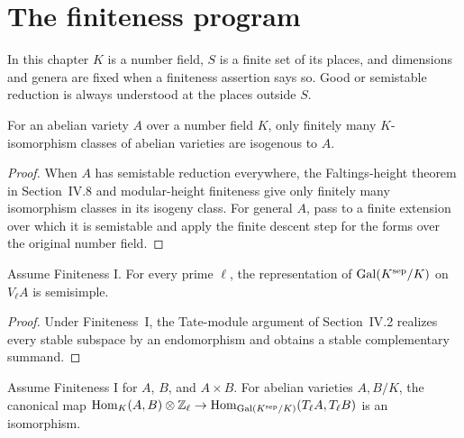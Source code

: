 \section{The finiteness program}

\begin{convention}
\label{conv:milne-finiteness-arithmetic}

In this chapter $K$ is a number field, $S$ is a finite set of its places, and
dimensions and genera are fixed when a finiteness assertion says so.  Good or
semistable reduction is always understood at the places outside $S$.
\end{convention}

\begin{theorem}[Finiteness I]
\label{thm:milne-finiteness-I}

For an abelian variety $A$ over a number field $K$, only finitely many
$K$-isomorphism classes of abelian varieties are isogenous to $A$.
\end{theorem}

\begin{proof}

When $A$ has semistable reduction everywhere, the Faltings-height theorem in
Section~IV.8 and modular-height finiteness give only finitely many isomorphism
classes in its isogeny class.  For general $A$, pass to a finite extension over
which it is semistable and apply the finite descent step for the forms over the
original number field.

\end{proof}


\begin{theorem}[Semisimplicity]
\label{thm:milne-finiteness-semisimplicity}

Assume Finiteness I.  For every prime $\ell$, the representation of
$\operatorname{Gal}(K^{\mathrm{sep}}/K)$ on $V_\ell A$ is semisimple.
\end{theorem}

\begin{proof}

Under Finiteness~I, the Tate-module argument of Section~IV.2 realizes every
stable subspace by an endomorphism and obtains a stable complementary summand.

\end{proof}


\begin{theorem}
\label{thm:milne-finiteness-tate-conjecture}

Assume Finiteness I for $A$, $B$, and $A\times B$.  For abelian varieties
$A,B/K$, the canonical map
$\operatorname{Hom}_K(A,B)\otimes\mathbb{Z}_\ell\to\operatorname{Hom}_{\operatorname{Gal}(K^{\mathrm{sep}}/K)}(T_\ell A,T_\ell B)$
is an isomorphism.
\end{theorem}

